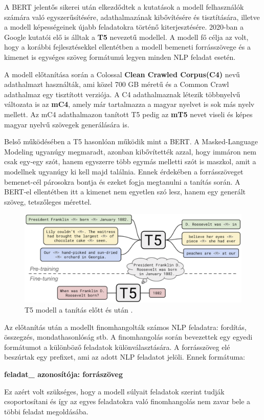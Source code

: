 
A BERT jelentős sikerei után elkezdődtek a kutatások a modell felhasználók számára való egyszerűsítésére, adathalmazának kibővítésére és tisztítására, illetve a modell képességeinek újabb feladatokra történő kiterjesztésére. 2020-ban a Google kutatói elő is álltak a \textbf{T5} nevezetű modellel. A modell fő célja az volt, hogy a korábbi fejlesztésekkel ellentétben a modell bemeneti forrásszövege és a kimenet is egységes szöveg formátumú legyen minden NLP feladat esetén.

A modell előtanítása során a Colossal \textbf{Clean Crawled Corpus(C4)} nevű adathalmazt használták, ami közel 700 GB méretű és a  Common Crawl adathalmaz egy tisztított verziója. A C4 adathalmaznak létezik többnyelvű változata is az \textbf{mC4}, amely már tartalmazza a magyar nyelvet is sok más nyelv mellett. Az mC4 adathalmazon tanított T5 pedig az \textbf{mT5} nevet viseli és képes magyar nyelvű szövegek generálására is.

Belső működésében a T5 hasonlóan működik mint a BERT. A Masked-Language Modeling ugyanúgy megmaradt, azonban kibővítették azzal, hogy immáron nem csak egy-egy szót, hanem egyszerre több egymás melletti szót is maszkol, amit a modellnek ugyanúgy ki kell majd találnia. Ennek érdekében a forrásszöveget bemenet-cél párosokra bontja és ezeket fogja megtanulni a tanítás során. A BERT-el ellentétben itt a kimenet nem egyetlen szó lesz, hanem egy generált szöveg, tetszőleges mérettel.

\newpage

\begin{figure}[h]
\centering
\includegraphics[scale=0.2]{images/t5.png}
\caption{T5 modell a tanítás előtt és után \cite{t5}.}
\label{fig:t5}
\end{figure}

Az előtanítás után a modellt finomhangolták számos NLP feladatra: fordítás,\\
összegzés, mondathasonlóság stb. A finomhangolás során bevezettek egy egyedi formátumot a különböző feladatok különválasztására. A forrásszöveg elé beszúrtak egy prefixet, ami az adott NLP feladatot jelöli. Ennek formátuma:

\textbf{feladat\_ azonosítója: forrászöveg}

Ez azért volt szükséges, hogy a modell súlyait feladatok szerint tudják csoportosítani és így az egyes feladatokra való finomhangolás nem zavar bele a többi feladat megoldásába.

